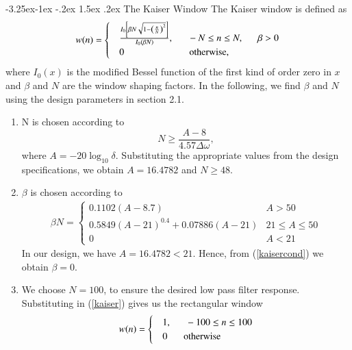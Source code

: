 \documentclass[article]{IEEEtran}
\makeatletter
\theoremstyle{remark}
\numberwithin{equation}{subsection}
\renewcommand\subsection{\@startsection{subsection}{2}{\z@}%
    {-3.25ex\@plus -1ex \@minus -.2ex}%
    {1.5ex \@plus .2ex}%
    {\normalfont\large\bfseries}}
\makeatother
\begin{document}
\subsection{The Kaiser Window}
The Kaiser window is defined as
\begin{align}
w(n) =
\begin{cases}
\label{kaiser}
& \frac{I_0\left[ \beta N \sqrt{1 - \left(\frac{n}{N}\right)^2} \right]}{I_0(\beta N)},
\indent -N \leq n \leq N, \indent \beta > 0  \\
& 0 \hspace{2.4cm}\text{otherwise,}
\end{cases}
\end{align}
where $I_0(x)$ is the modified Bessel function of the first kind of order zero in $x$ and $\beta$
and $N$ are the window shaping factors.  In the following,
we find $\beta$ and $N$ using the design parameters in section 2.1.

\begin{enumerate}
\item  N is chosen according to
\begin{equation}
N \geq \frac{A-8}{4.57\Delta \omega},
\end{equation}
where $A = -20\log_{10}\delta$.  Substituting the appropriate values from the design specifications, we obtain
$A = 16.4782$ and $N \geq 48$.

\item  $\beta$ is chosen according to
\begin{eqnarray}
\label{kaisercond}
\beta N = \left\{ \begin{array}{ll} 0.1102(A-8.7) & A > 50 \\
0.5849(A-21)^{0.4}+ 0.07886(A-21) & 21 \leq A \leq 50 \\
0 & A < 21\end{array} \right.
\end{eqnarray}
In our design, we have $A = 16.4782 < 21$.  Hence, from (\ref{kaisercond}) we obtain $\beta = 0$.  

\item We choose $N = 100$, to ensure the desired low pass filter response.  Substituting in (\ref{kaiser})
gives us the rectangular window
\begin{align}
w(n) =
\begin{cases}
& 1, \indent -100 \leq n \leq 100 \\
& 0 \hspace{6mm} \mbox{otherwise}
\end{cases}\label{rect}
\end{align}
\end{enumerate}
\end{document}

